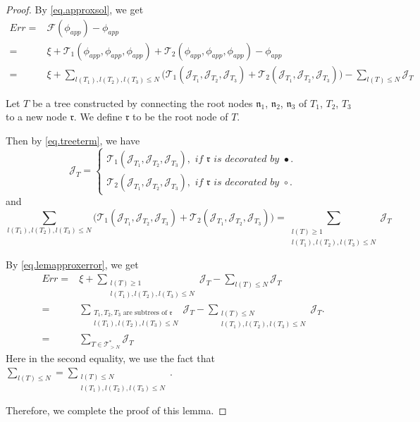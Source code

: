 \begin{proof} By \eqref{eq.approxsol}, we get
\begin{equation}\label{eq.lemapproxerror}
\begin{split}
 Err=&\mathcal{F}(\phi_{app})-\phi_{app} 
 \\
 =&\xi+\mathcal{T}_1(\phi_{app},\phi_{app},\phi_{app})+\mathcal{T}_2(\phi_{app},\phi_{app},\phi_{app})-\phi_{app}
 \\
 =&\xi+\sum_{l(T_1),l(T_2),l(T_3)\le N} \Big(\mathcal{T}_1(\mathcal{J}_{T_1},\mathcal{J}_{T_2},\mathcal{J}_{T_3})+\mathcal{T}_2(\mathcal{J}_{T_1},\mathcal{J}_{T_2},\mathcal{J}_{T_3})\Big)-\sum_{l(T)\le N} \mathcal{J}_T
\end{split}
\end{equation}

Let $T$ be a tree constructed by connecting the root nodes $\mathfrak{n}_1$, $\mathfrak{n}_2$, $\mathfrak{n}_3$ of $T_1$, $T_2$, $T_3$ to a new node $\mathfrak{r}$. We define $\mathfrak{r}$ to be the root node of $T$.

Then by \eqref{eq.treeterm}, we have
\begin{equation}
 \mathcal{J}_T=
 \begin{cases}
 \mathcal{T}_1(\mathcal{J}_{T_1}, \mathcal{J}_{T_2}, \mathcal{J}_{T_3}), \textit{ if }\mathfrak{r}\textit{ is decorated by }\bullet.
 \\
 \mathcal{T}_2(\mathcal{J}_{T_1}, \mathcal{J}_{T_2}, \mathcal{J}_{T_3}), \textit{ if }\mathfrak{r}\textit{ is decorated by }\circ.
 \end{cases}
\end{equation}
and 
\begin{equation}
 \sum_{l(T_1),l(T_2),l(T_3)\le N} \Big(\mathcal{T}_1(\mathcal{J}_{T_1},\mathcal{J}_{T_2},\mathcal{J}_{T_3})+\mathcal{T}_2(\mathcal{J}_{T_1},\mathcal{J}_{T_2},\mathcal{J}_{T_3})\Big)=\sum_{\substack{l(T)\ge 1\\ l(T_1),l(T_2),l(T_3)\le N}} \mathcal{J}_{T}
\end{equation}

By \eqref{eq.lemapproxerror}, we get
\begin{equation}
\begin{split}
 Err=&\xi+\sum_{\substack{l(T)\ge 1\\ l(T_1),l(T_2),l(T_3)\le N}} \mathcal{J}_{T}-\sum_{l(T)\le N} \mathcal{J}_T
 \\
 =&\sum_{\substack{T_1,T_2,T_3\text{ are subtrees of }\mathfrak{r}\\ l(T_1),l(T_2),l(T_3)\le N}} \mathcal{J}_{T}-\sum_{\substack{l(T)\le N\\ l(T_1),l(T_2),l(T_3)\le N}} \mathcal{J}_T.
 \\
 =&\sum_{T\in \mathcal{T}_{>N}^*} \mathcal{J}_T
\end{split}
\end{equation}
Here in the second equality, we use the fact that $\sum_{l(T)\le N}=\sum_{\substack{l(T)\le N\\ l(T_1),l(T_2),l(T_3)\le N}}$.

Therefore, we complete the proof of this lemma.
\end{proof}

